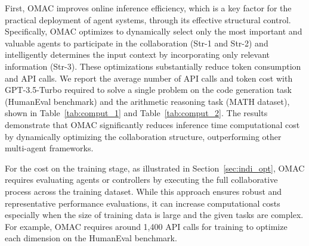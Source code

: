 


First, OMAC improves online inference efficiency, which is a key factor for the practical deployment of agent systems, through its effective structural control. Specifically, OMAC optimizes to dynamically select only the most important and valuable agents to participate in the collaboration (Str-1 and Str-2) and intelligently determines the input context by incorporating only relevant information (Str-3). These optimizations substantially reduce token consumption and API calls. We report the average number of API calls and token cost with GPT-3.5-Turbo required to solve a single problem on the code generation task (HumanEval benchmark) and the arithmetic reasoning task (MATH dataset), shown in Table~\ref{tab:comput_1} and Table~\ref{tab:comput_2}. The results demonstrate that OMAC significantly reduces inference time computational cost by dynamically optimizing the collaboration structure, outperforming other multi-agent frameworks.






For the cost on the training stage, as illustrated in Section~\ref{sec:indi_opt}, OMAC requires evaluating agents or controllers by executing the full collaborative process across the training dataset. While this approach ensures robust and representative performance evaluations,
it can increase computational costs especially when the size of training data is large and the given tasks are complex. For example, OMAC requires around 1,400 API calls for training to optimize each dimension on the HumanEval benchmark.

